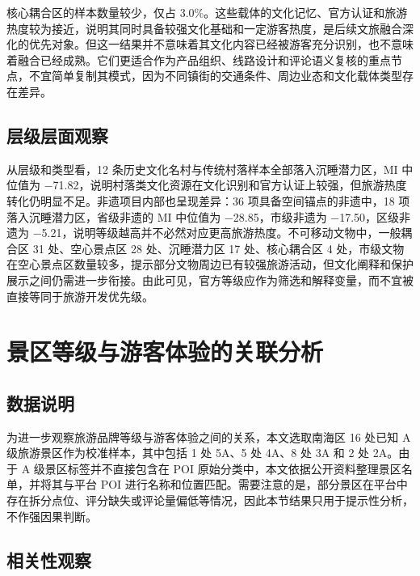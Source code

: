 核心耦合区的样本数量较少，仅占 3.0\%。这些载体的文化记忆、官方认证和旅游热度较为接近，说明其同时具备较强文化基础和一定游客热度，是后续文旅融合深化的优先对象。但这一结果并不意味着其文化内容已经被游客充分识别，也不意味着融合已经成熟。它们更适合作为产品组织、线路设计和评论语义复核的重点节点，不宜简单复制其模式，因为不同镇街的交通条件、周边业态和文化载体类型存在差异。

\subsection{层级层面观察}\label{ux5c42ux7ea7ux5c42ux9762ux89c2ux5bdf}

从层级和类型看，12 条历史文化名村与传统村落样本全部落入沉睡潜力区，MI 中位值为 −71.82，说明村落类文化资源在文化识别和官方认证上较强，但旅游热度转化仍明显不足。非遗项目内部也呈现差异：36 项具备空间锚点的非遗中，18 项落入沉睡潜力区，省级非遗的 MI 中位值为 −28.85，市级非遗为 −17.50，区级非遗为 −5.21，说明等级越高并不必然对应更高旅游热度。不可移动文物中，一般耦合区 31 处、空心景点区 28 处、沉睡潜力区 17 处、核心耦合区 4 处，市级文物在空心景点区数量较多，提示部分文物周边已有较强旅游活动，但文化阐释和保护展示之间仍需进一步衔接。由此可见，官方等级应作为筛选和解释变量，而不宜被直接等同于旅游开发优先级。

\section{景区等级与游客体验的关联分析}\label{ux666fux533aux7b49ux7ea7ux4e0eux6e38ux5ba2ux4f53ux9a8cux7684ux5173ux8054ux5206ux6790}

\subsection{数据说明}\label{ux6570ux636eux8bf4ux660e}

为进一步观察旅游品牌等级与游客体验之间的关系，本文选取南海区 16 处已知 A 级旅游景区作为校准样本，其中包括 1 处 5A、5 处 4A、8 处 3A 和 2 处 2A。由于 A 级景区标签并不直接包含在 POI 原始分类中，本文依据公开资料整理景区名单，并将其与平台 POI 进行名称和位置匹配。需要注意的是，部分景区在平台中存在拆分点位、评分缺失或评论量偏低等情况，因此本节结果只用于提示性分析，不作强因果判断。

\subsection{相关性观察}\label{ux76f8ux5173ux6027ux89c2ux5bdf}


